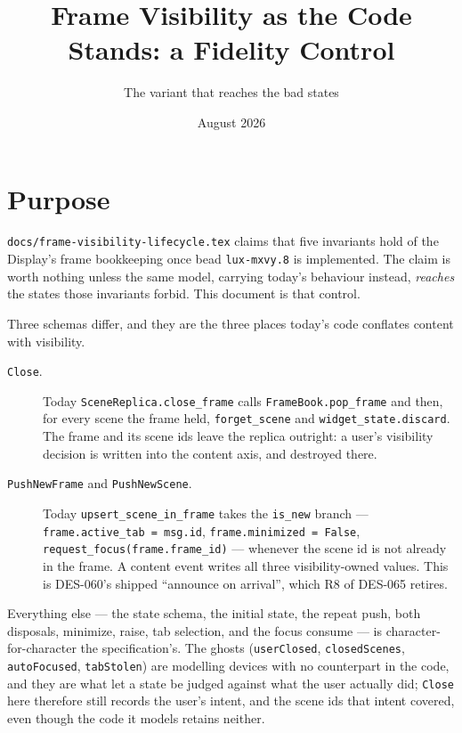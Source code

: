 \documentclass[a4paper,10pt,fleqn]{article}
\begin{document}
\title{Frame Visibility as the Code Stands: a Fidelity Control}
\author{The variant that reaches the bad states}
\date{August 2026}
\maketitle

\section{Purpose}

\texttt{docs/frame-visibility-lifecycle.tex} claims that five invariants hold
of the Display's frame bookkeeping once bead \texttt{lux-mxvy.8} is
implemented.  The claim is worth nothing unless the same model, carrying
today's behaviour instead, \emph{reaches} the states those invariants forbid.
This document is that control.

Three schemas differ, and they are the three places today's code conflates
content with visibility.

\begin{description}
  \item[\texttt{Close}.]  Today \texttt{SceneReplica.close\_frame} calls
    \texttt{FrameBook.pop\_frame} and then, for every scene the frame held,
    \texttt{forget\_scene} and \texttt{widget\_state.discard}.  The frame and
    its scene ids leave the replica outright: a user's visibility decision is
    written into the content axis, and destroyed there.
  \item[\texttt{PushNewFrame} and \texttt{PushNewScene}.]  Today
    \texttt{upsert\_scene\_in\_frame} takes the \texttt{is\_new} branch ---
    \texttt{frame.active\_tab = msg.id}, \texttt{frame.minimized = False},
    \texttt{request\_focus(frame.frame\_id)} --- whenever the scene id is not
    already in the frame.  A content event writes all three
    visibility-owned values.  This is DES-060's shipped ``announce on
    arrival'', which R8 of DES-065 retires.
\end{description}

Everything else --- the state schema, the initial state, the repeat push, both
disposals, minimize, raise, tab selection, and the focus consume --- is
character-for-character the specification's.  The ghosts
(\texttt{userClosed}, \texttt{closedScenes}, \texttt{autoFocused},
\texttt{tabStolen}) are modelling devices with no counterpart in the code, and
they are what let a state be judged against what the user actually did;
\texttt{Close} here therefore still records the user's intent, and the scene
ids that intent covered, even though the code it models retains neither.
\end{document}
